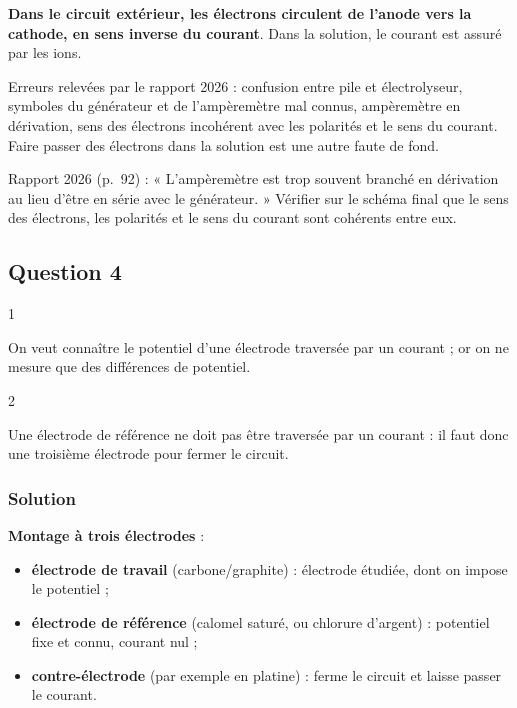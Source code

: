 \documentclass[11pt,a4paper]{article}
\providecommand{\tightlist}{\setlength{\itemsep}{0pt}\setlength{\parskip}{0pt}}
\begin{document}
\textbf{Dans le circuit extérieur, les électrons circulent de l'anode vers la cathode, en sens inverse du courant}. Dans la solution, le courant est assuré par les ions.

\begin{piege}

Erreurs relevées par le rapport 2026 : confusion entre pile et électrolyseur, symboles du générateur et de l'ampèremètre mal connus, ampèremètre en dérivation, sens des électrons incohérent avec les polarités et le sens du courant. Faire passer des électrons dans la solution est une autre faute de fond.

\end{piege}

\begin{jury}

Rapport 2026 (p.~92) : « L'ampèremètre est trop souvent branché en dérivation au lieu d'être en série avec le générateur. » Vérifier sur le schéma final que le sens des électrons, les polarités et le sens du courant sont cohérents entre eux.

\end{jury}

\hypertarget{question-4}{%
\subsection{Question 4}\label{question-4}}

\begin{indication}{1}

On veut connaître le potentiel d'une électrode traversée par un courant ; or on ne mesure que des différences de potentiel.

\end{indication}

\begin{indication}{2}

Une électrode de référence ne doit pas être traversée par un courant : il faut donc une troisième électrode pour fermer le circuit.

\end{indication}

\hypertarget{solution-3}{%
\subsubsection{Solution}\label{solution-3}}

\textbf{Montage à trois électrodes} :

\begin{itemize}
\tightlist
\item
  \textbf{électrode de travail} (carbone/graphite) : électrode étudiée, dont on impose le potentiel ;
\item
  \textbf{électrode de référence} (calomel saturé, ou chlorure d'argent) : potentiel fixe et connu, courant nul ;
\item
  \textbf{contre-électrode} (par exemple en platine) : ferme le circuit et laisse passer le courant.
\end{itemize}
\end{document}
